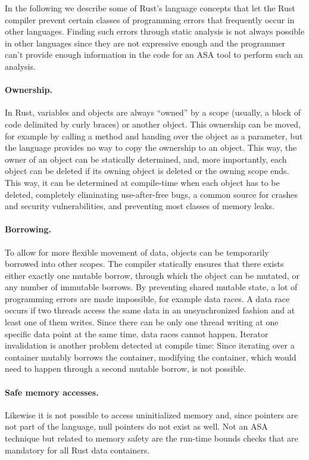 \documentclass{scrartcl}
\begin{document}
In the following we describe some of Rust's language concepts that let the Rust compiler prevent certain classes of programming errors that frequently occur in other languages. Finding such errors through static analysis is not always possible in other languages since they are not expressive enough and the programmer can't provide enough information in the code for an ASA tool to perform such an analysis.

\paragraph{Ownership.} In Rust, variables and objects are always ``owned'' by a scope (usually, a block of code delimited by curly braces) or another object. This ownership can be moved, for example by calling a method and handing over the object as a parameter, but the language provides no way to copy the ownership to an object. This way, the owner of an object can be statically determined, and, more importantly, each object can be deleted if its owning object is deleted or the owning scope ends. This way, it can be determined at compile-time when each object has to be deleted, completely eliminating use-after-free bugs, a common source for crashes and security vulnerabilities, and preventing most classes of memory leaks.

\paragraph{Borrowing.} To allow for more flexible movement of data, objects can be temporarily borrowed into other scopes. The compiler statically ensures that there exists either exactly one mutable borrow, through which the object can be mutated, or any number of immutable borrows. By preventing shared mutable state, a lot of programming errors are made impossible, for example data races. A data race occurs if two threads access the same data in an unsynchronized fashion and at least one of them writes. Since there can be only one thread writing at one specific data point at the same time, data races cannot happen. Iterator invalidation is another problem detected at compile time: Since iterating over a container mutably borrows the container, modifying the container, which would need to happen through a second mutable borrow, is not possible.

\paragraph{Safe memory accesses.} Likewise it is not possible to access uninitialized memory and, since pointers are not part of the language, null pointers do not exist as well. Not an ASA technique but related to memory safety are the run-time bounds checks that are mandatory for all Rust data containers.
\end{document}
